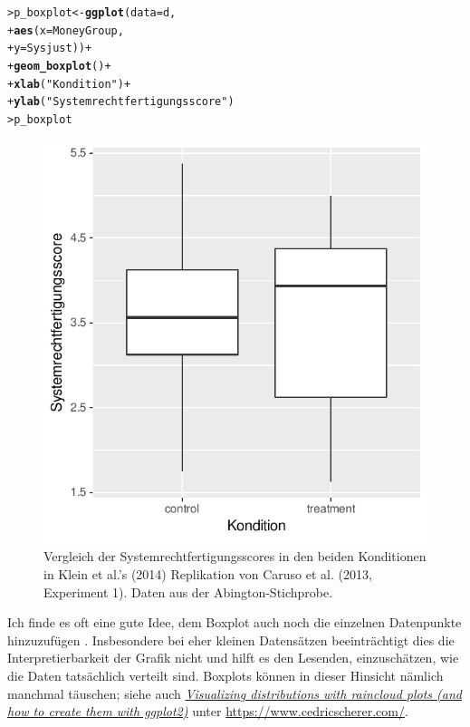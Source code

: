 \documentclass[oneside, 10pt]{book}\usepackage[]{graphicx}\usepackage[]{xcolor}
\makeatletter
\newcommand{\hlstr}[1]{\textcolor[rgb]{0.192,0.494,0.8}{#1}}%
\newcommand{\hlopt}[1]{\textcolor[rgb]{0,0,0}{#1}}%
\newcommand{\hlstd}[1]{\textcolor[rgb]{0.345,0.345,0.345}{#1}}%
\newcommand{\hlkwb}[1]{\textcolor[rgb]{0.69,0.353,0.396}{#1}}%
\newcommand{\hlkwc}[1]{\textcolor[rgb]{0.333,0.667,0.333}{#1}}%
\newcommand{\hlkwd}[1]{\textcolor[rgb]{0.737,0.353,0.396}{\textbf{#1}}}%
\newenvironment{kframe}{%
 \def\at@end@of@kframe{}%
 \ifinner\ifhmode%
  \def\at@end@of@kframe{\end{minipage}}%
  \begin{minipage}{\columnwidth}%
 \fi\fi%
 \def\FrameCommand##1{\hskip\@totalleftmargin \hskip-\fboxsep
 \colorbox{shadecolor}{##1}\hskip-\fboxsep
     \hskip-\linewidth \hskip-\@totalleftmargin \hskip\columnwidth}%
 \MakeFramed {\advance\hsize-\width
   \@totalleftmargin\z@ \linewidth\hsize
   \@setminipage}}%
 {\par\unskip\endMakeFramed%
 \at@end@of@kframe}
\newenvironment{knitrout}{}{} %
\makeatother
\begin{document}
\begin{knitrout}
\color{fgcolor}\begin{kframe}
\begin{alltt}
\hlstd{> }\hlstd{p_boxplot} \hlkwb{<-} \hlkwd{ggplot}\hlstd{(}\hlkwc{data} \hlstd{= d,}
\hlstd{+ }                    \hlkwd{aes}\hlstd{(}\hlkwc{x} \hlstd{= MoneyGroup,}
\hlstd{+ }                        \hlkwc{y} \hlstd{= Sysjust))} \hlopt{+}
\hlstd{+ }  \hlkwd{geom_boxplot}\hlstd{()} \hlopt{+}
\hlstd{+ }  \hlkwd{xlab}\hlstd{(}\hlstr{"Kondition"}\hlstd{)} \hlopt{+}
\hlstd{+ }  \hlkwd{ylab}\hlstd{(}\hlstr{"Systemrechtfertigungsscore"}\hlstd{)}
\hlstd{> }\hlstd{p_boxplot}
\end{alltt}
\end{kframe}\begin{figure}[tp]

{\centering \includegraphics[width=.4\textwidth]{figs/unnamed-chunk-243-1} 

}

\caption{Vergleich der Systemrechtfertigungsscores in den beiden Konditionen in Klein et al.'s (2014) Replikation von Caruso et al. (2013, Experiment 1). Daten aus der Abington-Stichprobe.\label{fig:boxplotklein1}}\label{fig:unnamed-chunk-243}
\end{figure}

\end{knitrout}

Ich finde es oft eine gute Idee,
dem Boxplot auch noch die einzelnen Datenpunkte
hinzuzufügen \citep[siehe auch][]{Weissgerber2015}.
Insbesondere bei eher kleinen Datensätzen
beeinträchtigt dies die Interpretierbarkeit der Grafik nicht
und hilft es den Lesenden, einzuschätzen, wie die
Daten tatsächlich verteilt sind. Boxplots können
in dieser Hinsicht nämlich manchmal täuschen;
siehe auch \href{https://www.cedricscherer.com/2021/06/06/visualizing-distributions-with-raincloud-plots-and-how-to-create-them-with-ggplot2/}{\textit{Visualizing distributions with raincloud plots (and how to create them with ggplot2)}}
unter \url{https://www.cedricscherer.com/}.
\end{document}
